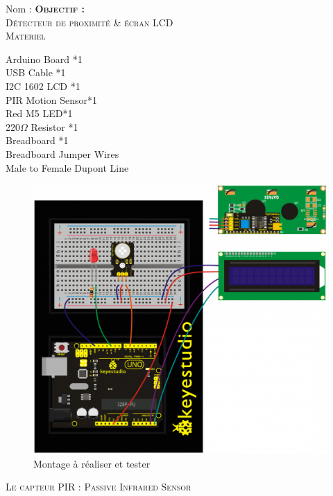 \documentclass[a4paper, 11pt]{article}           %
\newcommand{\objectif}[1]{\textsc{\huge \textbf{Objectif :}\\[2mm] #1} }
\newcommand{\partie}[1]{\textsc{\Large #1} }
\begin{document}
\sffamily
\hfill Nom : {\noindent\makebox[5cm]{\dotfill}\endgraf}
\objectif{Détecteur de proximité \& écran LCD} \\

\partie{Materiel}                         %
\begin{multicols}{2}
Arduino Board *1 \\
USB Cable *1 \\
I2C 1602 LCD *1 \\
PIR Motion Sensor*1 \\
Red M5 LED*1 \\
220$\Omega$ Resistor *1 \\
Breadboard *1 \\
Breadboard Jumper Wires \\
Male to Female Dupont Line
\end{multicols}
\begin{figure}[!h]
\begin{center}
\includegraphics[width=\textwidth]{keyes_cablage_PIR_LCD_LED}
\caption{Montage à réaliser et tester}
\label{montagePIR}
\end{center}
\end{figure}


\newpage


\partie{Le capteur PIR : Passive Infrared Sensor} \\                      %
\end{document}
